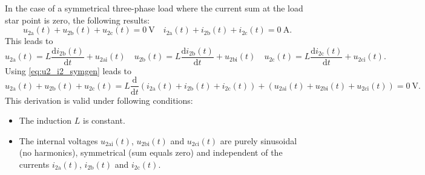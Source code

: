 \begin{solutionblock}
    In the case of a symmetrical three-phase load where the current sum at the load star point is zero, 
    the following results:
    \begin{equation}
        u_{\mathrm{2a}}(t) + u_{\mathrm{2b}}(t) + u_{\mathrm{2c}}(t) = \SI{0}{\volt} \quad 
        i_{\mathrm{2a}}(t) + i_{\mathrm{2b}}(t) + i_{\mathrm{2c}}(t) = \SI{0}{\ampere}.
        \label{eq:u2_i2_symgen}        
    \end{equation}
    This leads to
    \begin{equation}
        u_{\mathrm{2a}}(t) = L \frac{\mathrm{d}i_{\mathrm{2b}}(t)}{\mathrm{d}t}+u_{\mathrm{2ai}}(t)
        \quad u_{\mathrm{2b}}(t) = L \frac{\mathrm{d}i_{\mathrm{2b}}(t)}{\mathrm{d}t}+u_{\mathrm{2bi}}(t)
        \quad u_{\mathrm{2c}}(t) = L \frac{\mathrm{d}i_{\mathrm{2c}}(t)}{\mathrm{d}t}+u_{\mathrm{2ci}}(t).
        \label{eq:u2_i2_symL}         
    \end{equation}
    Using \eqref{eq:u2_i2_symgen} leads to
    \begin{equation}
        u_{\mathrm{2a}}(t) + u_{\mathrm{2b}}(t) + u_{\mathrm{2c}}(t) 
        = L \frac{\mathrm{d}}{\mathrm{d}t} \left( i_{\mathrm{2a}}(t)+i_{\mathrm{2b}}(t)+i_{\mathrm{2c}}(t) \right) 
         + \left( u_{\mathrm{2ai}}(t) + u_{\mathrm{2bi}}(t) + u_{\mathrm{2ci}}(t)\right)=\SI{0}{\volt}.
        \label{eq:u2_i2_symres} 
    \end{equation}
    This derivation is valid under following conditions:
    \begin{itemize}
        \item The induction $L$ is constant.
        \item The internal voltages $u_{\mathrm{2ai}}(t)$, $u_{\mathrm{2bi}}(t)$ and $u_{\mathrm{2ci}}(t)$ 
        are purely sinusoidal (no harmonics), symmetrical (sum equals zero) and independent of the currents
        $i_{\mathrm{2a}}(t)$, $i_{\mathrm{2b}}(t)$ and $i_{\mathrm{2c}}(t)$.
    \end{itemize}     
\end{solutionblock}

